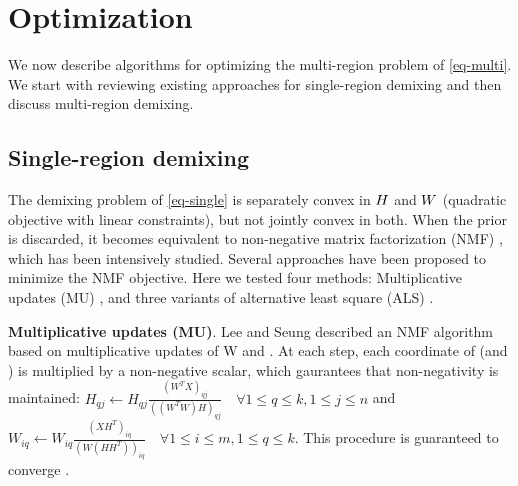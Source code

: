 \section{Optimization}
We now describe algorithms for optimizing the multi-region problem of \eqref{eq-multi}. We start with reviewing existing approaches for single-region demixing and then discuss multi-region demixing. 



\subsection{Single-region demixing}
The demixing problem of \eqref{eq-single} is separately convex in ${H}$ and $W$ (quadratic objective with linear constraints), but not jointly convex in both. When the prior is discarded, it becomes equivalent to non-negative matrix factorization (NMF) \cite{leenmfs}, which has been intensively studied. Several approaches have been proposed to minimize the NMF objective.
%
Here we tested four methods: Multiplicative updates (MU) \cite{leenmfs}, and three variants of alternative least square (ALS) \cite{lin2007projected,kim2008activeset,kim2011fast}. 

{\bf {Multiplicative updates (MU)}}. Lee and Seung \cite{leenmfs} described an NMF algorithm based on multiplicative updates of W and \Htext. At each step, each coordinate of \Htext (and \W) is multiplied by a non-negative scalar, which gaurantees that non-negativity is maintained: $H_{qj} \leftarrow H_{qj} \frac{(W^TX)_{qj}}{((W^TW)H)_{qj}} \quad
\forall 1\leq q \leq k, 1\leq j \leq n$ and $W_{iq} \leftarrow W_{iq} \frac{(XH^T)_{iq}}{(W(HH^T))_{iq}} \quad \forall 1\leq i \leq m, 1\leq q \leq k$.
This procedure is guaranteed to converge \cite{leenmfs,lin2007convergence}. 

